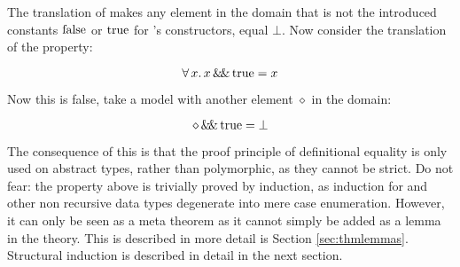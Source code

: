 The translation of \hs{\&\&} makes any element in the domain that is not
the introduced constants $\mathrm{false}$ or $\mathrm{true}$ for 's
constructors, equal $\bot$. Now consider the translation of the
property:

\begin{equation*}
\forall \, x . \, x \, \mathrm{\&\!\&} \, \mathrm{true} = x
\end{equation*}

Now this is false, take a model with another element $\diamond$ in the
domain:

$$\diamond \, \mathrm{\&\!\&} \, \mathrm{true} = \bot$$

The consequence of this is that the proof principle of definitional
equality is only used on abstract types, rather than polymorphic, as
they cannot be strict. Do not fear: the property above is trivially
proved by induction, as induction for  and other non
recursive data types degenerate into mere case enumeration. However,
it can only be seen as a meta theorem as it cannot simply be added as
a lemma in the theory. This is described in more detail is Section
\ref{sec:thmlemmas}. Structural induction is described in detail in
the next section.


